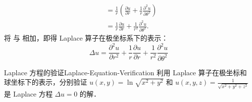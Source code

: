 \begin{solution}
\begin{equation}
\begin{aligned}
             & = \frac{1}{r} \left( \frac{\partial u}{\partial r} + \frac{1}{r} \frac{\partial^2 u}{\partial \theta^2} \right)                                                                                                                                                                                                                                                                 \\
             & = \frac{1}{r} \frac{\partial u}{\partial r} + \frac{1}{r^2} \frac{\partial^2 u}{\partial \theta^2}.
        \end{aligned}
    \end{equation}
    将  与  相加，即得 Laplace 算子在极坐标系下的表示：
    \begin{equation}
        \boxed{\Delta u = \frac{\partial^2 u}{\partial r^2} + \frac{1}{r} \frac{\partial u}{\partial r} + \frac{1}{r^2} \frac{\partial^2 u}{\partial \theta^2}}
    \end{equation}
\end{solution}

\begin{problem}{Laplace 方程的验证}{Laplace-Equation-Verification}
    利用 Laplace 算子在极坐标和球坐标下的表示，分别验证 $u(x,y) = \ln \sqrt{x^2 + y^2}$ 和 $u(x,y,z) = \frac{1}{\sqrt{x^2+y^2+z^2}}$ 是 Laplace 方程 $\Delta u = 0$ 的解．
\end{problem}

